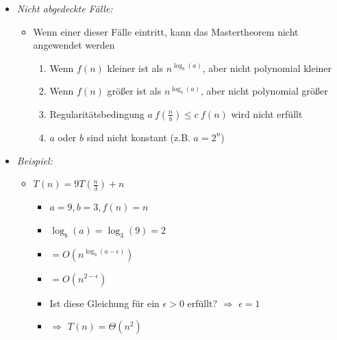 \documentclass[
    ngerman,
    color=3b,
    load_common, %
    summary,
    boxarc,
]{tuda_summary}
\begin{document}
\begin{itemize}
\begin{itemize}
              \item \textit{Nicht abgedeckte Fälle:}
                    \begin{itemize}
                        \item Wenn einer dieser Fälle eintritt, kann das Mastertheorem nicht angewendet werden
                              \begin{enumerate}
                                  \item Wenn $f(n)$ kleiner ist als $n^{\log_b(a)}$, aber nicht polynomial kleiner
                                  \item Wenn $f(n)$ größer ist als $n^{\log_b(a)}$, aber nicht polynomial größer
                                  \item Regularitätsbedingung $a~f(\frac{n}{b}) \leq c~f(n)$ wird nicht erfüllt
                                  \item $a$ oder $b$ sind nicht konstant (z.B. $a=2^n$)
                              \end{enumerate}
                    \end{itemize}
                    \clearpage
              \item \textit{Beispiel:}
                    \begin{itemize}
                        \item \textit{$T(n) = 9T(\frac{n}{3}) + n$}
                              \begin{itemize}
                                  \item $a=9, b=3, f(n)=n$
                                  \item $\log_b(a) = \log_3(9) = 2$
                                  \item {} $= O(n^{\log_b(a-\epsilon)})$
                                  \item[] {\makebox[1.5cm][l]{}} $= O(n^{2-\epsilon})$
                                  \item Ist diese Gleichung für ein $\epsilon > 0$ erfüllt? $\Rightarrow$ $\epsilon = 1$
                                  \item {} $\Rightarrow$ $T(n) = \Theta(n^2)$
                              \end{itemize}


\end{itemize}
\end{itemize}
\end{itemize}
\end{document}
